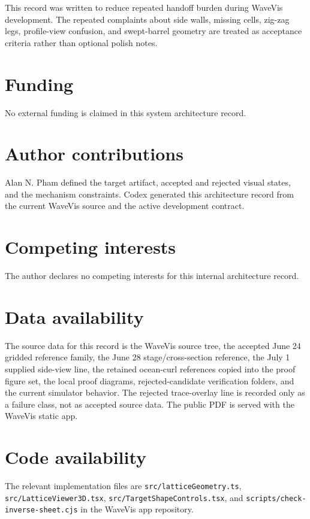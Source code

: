 \documentclass[12pt,letterpaper]{article}
\newcommand{\code}[1]{\texttt{#1}}
\begin{document}
This record was written to reduce repeated handoff burden during WaveVis development. The repeated complaints about side walls, missing cells, zig-zag legs, profile-view confusion, and swept-barrel geometry are treated as acceptance criteria rather than optional polish notes.

\section{Funding}

No external funding is claimed in this system architecture record.

\section{Author contributions}

Alan N. Pham defined the target artifact, accepted and rejected visual states, and the mechanism constraints. Codex generated this architecture record from the current WaveVis source and the active development contract.

\section{Competing interests}

The author declares no competing interests for this internal architecture record.

\section{Data availability}

The source data for this record is the WaveVis source tree, the accepted June 24 gridded reference family, the June 28 stage/cross-section reference, the July 1 supplied side-view line, the retained ocean-curl references copied into the proof figure set, the local proof diagrams, rejected-candidate verification folders, and the current simulator behavior. The rejected trace-overlay line is recorded only as a failure class, not as accepted source data. The public PDF is served with the WaveVis static app.

\section{Code availability}

The relevant implementation files are \code{src/latticeGeometry.ts}, \code{src/LatticeViewer3D.tsx}, \code{src/TargetShapeControls.tsx}, and \code{scripts/check-inverse-sheet.cjs} in the WaveVis app repository.
\end{document}

